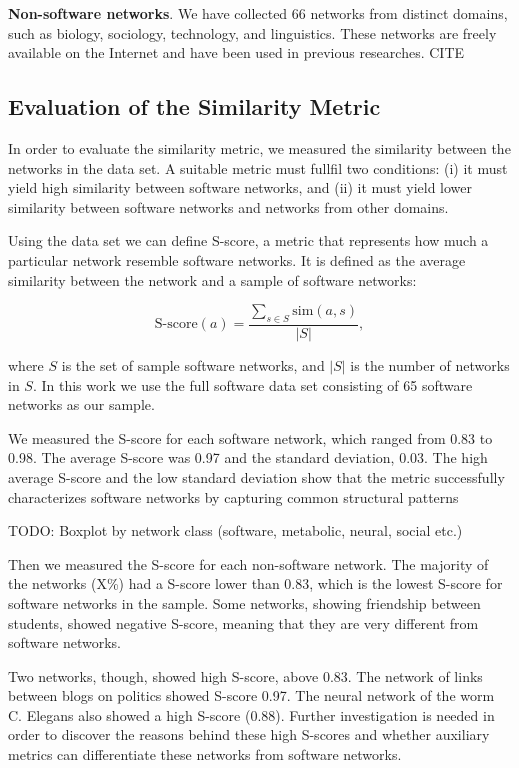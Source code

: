 \textbf{Non-software networks}. We have collected 66 networks from distinct
domains, such as biology, sociology, technology, and linguistics. These networks
are freely available on the Internet and have been used in previous researches.
CITE


\subsection{Evaluation of the Similarity Metric}

In order to evaluate the similarity metric, we measured the similarity between
the networks in the data set. A suitable metric must fullfil two conditions: (i)
it must yield high similarity between software networks, and (ii) it must yield
lower similarity between software networks and networks from other domains.

Using the data set we can define S-score, a metric that represents how much a
particular network resemble software networks. It is defined as the average
similarity between the network and a sample of software networks:

$$
\mathrm{S\mbox{-}score}(a) = \frac{
\sum_{s \in S} \mathrm{sim}(a, s)
}{|S|} \mathrm{,}
$$

where $S$ is the set of sample software networks, and $|S|$ is the number of
networks in $S$. In this work we use the full software data set consisting of 65
software networks as our sample.

We measured the S-score for each software network, which ranged from 0.83 to
0.98. The average S-score was 0.97 and the standard deviation, 0.03. The high
average S-score and the low standard deviation show that the metric successfully
characterizes software networks by capturing common structural patterns

TODO: Boxplot by network class (software, metabolic, neural, social etc.)

Then we measured the S-score for each non-software network. The majority of the
networks (X\%) had a S-score lower than 0.83, which is the lowest S-score for
software networks in the sample. Some networks, showing friendship between
students, showed negative S-score, meaning that they are very different from
software networks.

Two networks, though, showed high S-score, above 0.83. The network of links
between blogs on politics showed S-score 0.97. The neural network of the worm
C. Elegans also showed a high S-score (0.88). Further investigation is needed
in order to discover the reasons behind these high S-scores and whether
auxiliary metrics can differentiate these networks from software networks.

